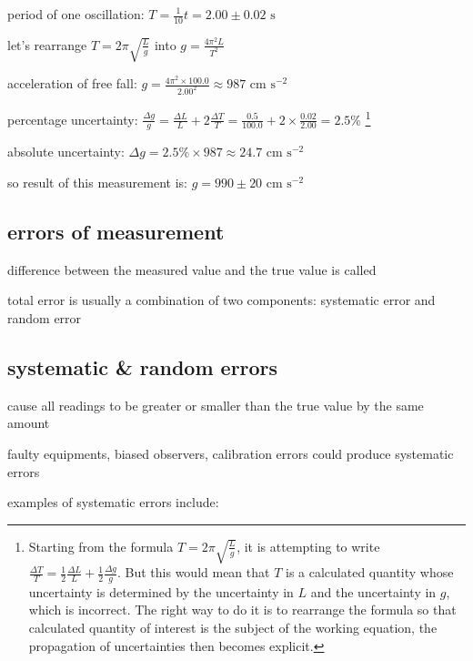 \sol period of one oscillation: $T = \frac{1}{10}t = 2.00 \pm 0.02 \text{ s}$

let's rearrange $T=2\pi\sqrt{\frac{L}{g}}$ into $g = \frac{4\pi^2L}{T^2}$

acceleration of free fall: $g = \frac{4\pi^2 \times 100.0}{2.00^2} \approx 987 \text{ cm s}^{-2}$

\eqyskip percentage uncertainty: $\frac{\Delta g}{g} = \frac{\Delta L}{L} + 2\frac{\Delta T}{T} = \frac{0.5}{100.0} + 2\times\frac{0.02}{2.00} = 2.5\%$ \footnote{Starting from the formula $T=2\pi\sqrt{\frac{L}{g}}$, it is attempting to write $\frac{\Delta T}{T} = \frac{1}{2}\frac{\Delta L}{L} + \frac{1}{2}\frac{\Delta g}{g}$. But this would mean that $T$ is a calculated quantity whose uncertainty is determined by the uncertainty in $L$ and the uncertainty in $g$, which is incorrect. The right way to do it is to rearrange the formula so that calculated quantity of interest is the subject of the working equation, the propagation of uncertainties then becomes explicit.}

absolute uncertainty: $\Delta g = 2.5\% \times 987 \approx 24.7 \text{ cm s}^{-2}$

so result of this measurement is: $ g = 990 \pm 20 \text{ cm s}^{-2}$ \eoe




\subsection{errors of measurement}

difference between the measured value and the true value is called 

total error is usually a combination of two components: systematic error and random error

\subsection{systematic \& random errors}

\begin{ilight}
	 cause all readings to be greater or smaller than the true value by the same amount
\end{ilight}

\cmt faulty equipments, biased observers, calibration errors could produce systematic errors

examples of systematic errors include:

